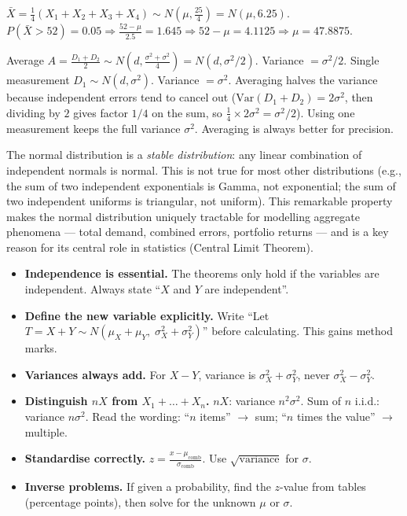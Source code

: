 \documentclass[11pt]{article}
\begin{document}
\begin{corrige}[Exercise 4]
$\bar{X} = \frac{1}{4}(X_1+X_2+X_3+X_4) \sim N(\mu, \frac{25}{4}) = N(\mu, 6.25)$.
$P(\bar{X} > 52) = 0.05 \Rightarrow \frac{52-\mu}{2.5} = 1.645 \Rightarrow 52-\mu = 4.1125 \Rightarrow \mu = 47.8875$.
\end{corrige}

\begin{corrige}[Exercise 5]
Average $A = \frac{D_1+D_2}{2} \sim N(d, \frac{\sigma^2+\sigma^2}{4}) = N(d, \sigma^2/2)$. Variance $= \sigma^2/2$.
Single measurement $D_1 \sim N(d, \sigma^2)$. Variance $= \sigma^2$.
Averaging halves the variance because independent errors tend to cancel out ($\mathrm{Var}(D_1+D_2) = 2\sigma^2$, then dividing by $2$ gives factor $1/4$ on the sum, so $\frac{1}{4}\times 2\sigma^2 = \sigma^2/2$). Using one measurement keeps the full variance $\sigma^2$. Averaging is always better for precision.
\end{corrige}

\begin{savaistu}
The normal distribution is a \emph{stable distribution}: any linear combination of independent normals is normal. This is not true for most other distributions (e.g., the sum of two independent exponentials is Gamma, not exponential; the sum of two independent uniforms is triangular, not uniform). This remarkable property makes the normal distribution uniquely tractable for modelling aggregate phenomena — total demand, combined errors, portfolio returns — and is a key reason for its central role in statistics (Central Limit Theorem).
\end{savaistu}

\begin{aretenir}
\begin{itemize}
    \item \textbf{Independence is essential.} The theorems only hold if the variables are independent. Always state ``$X$ and $Y$ are independent''.
    \item \textbf{Define the new variable explicitly.} Write ``Let $T = X + Y \sim N(\mu_X+\mu_Y,\; \sigma_X^2+\sigma_Y^2)$'' before calculating. This gains method marks.
    \item \textbf{Variances always add.} For $X-Y$, variance is $\sigma_X^2 + \sigma_Y^2$, never $\sigma_X^2 - \sigma_Y^2$.
    \item \textbf{Distinguish $nX$ from $X_1+\dots+X_n$.} $nX$: variance $n^2\sigma^2$. Sum of $n$ i.i.d.: variance $n\sigma^2$. Read the wording: ``$n$ items'' $\rightarrow$ sum; ``$n$ times the value'' $\rightarrow$ multiple.
    \item \textbf{Standardise correctly.} $z = \frac{x - \mu_{\text{comb}}}{\sigma_{\text{comb}}}$. Use $\sqrt{\text{variance}}$ for $\sigma$.
    \item \textbf{Inverse problems.} If given a probability, find the $z$-value from tables (percentage points), then solve for the unknown $\mu$ or $\sigma$.
\end{itemize}
\end{aretenir}
\end{document}
